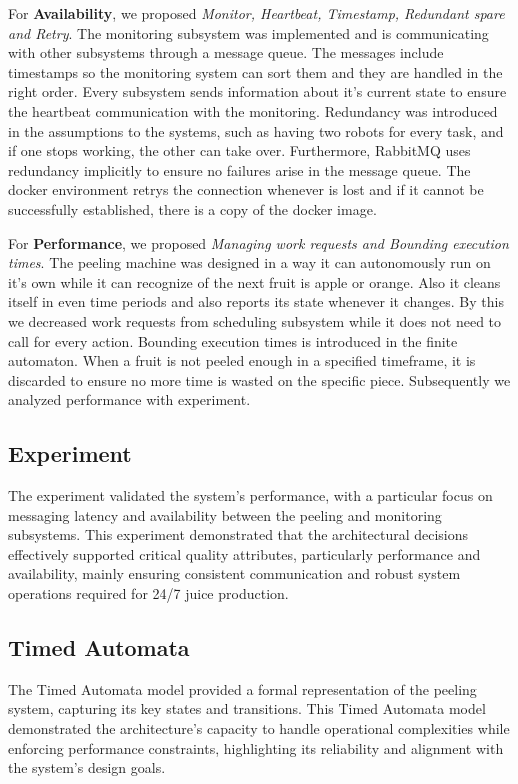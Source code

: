 \documentclass[conference]{IEEEtran}
\begin{document}
For \textbf{Availability}, we proposed \textit{Monitor, Heartbeat, Timestamp, Redundant spare and Retry}. The monitoring subsystem was implemented and is communicating with other subsystems through a message queue. The messages include timestamps so the monitoring system can sort them and they are handled in the right order. Every subsystem sends information about it's current state to ensure the heartbeat communication with the monitoring. Redundancy was introduced in the assumptions to the systems, such as having two robots for every task, and if one stops working, the other can take over. Furthermore, RabbitMQ uses redundancy implicitly to ensure no failures arise in the message queue. The docker environment retrys the connection whenever is lost and if it cannot be successfully established, there is a copy of the docker image.

For \textbf{Performance}, we proposed \textit{Managing work requests and Bounding execution times}. The peeling machine was designed in a way it can autonomously run on it's own while it can recognize of the next fruit is apple or orange. Also it cleans itself in even time periods and also reports its state whenever it changes. By this we decreased work requests from scheduling subsystem while it does not need to call for every action. Bounding execution times is introduced in the finite automaton. When a fruit is not peeled enough in a specified timeframe, it is discarded to ensure no more time is wasted on the specific piece. Subsequently we analyzed performance with experiment. 

\subsection{Experiment}
The experiment validated the system's performance, with a particular focus on messaging latency and availability between the peeling and monitoring subsystems. This experiment demonstrated that the architectural decisions effectively supported critical quality attributes, particularly performance and availability, mainly ensuring consistent communication and robust system operations required for 24/7 juice production.

\subsection{Timed Automata}
The Timed Automata model provided a formal representation of the peeling system, capturing its key states and transitions. This Timed Automata model demonstrated the architecture's capacity to handle operational complexities while enforcing performance constraints, highlighting its reliability and alignment with the system's design goals.
\end{document}
